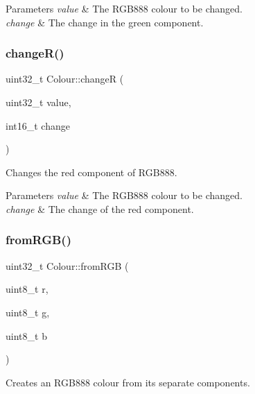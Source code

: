 \begin{DoxyParams}{Parameters}
{\em value} & The R\+G\+B888 colour to be changed. \\
\hline
{\em change} & The change in the green component. \\
\hline
\end{DoxyParams}
\mbox{\label{namespaceColour_ad2740cc3e6b9f1d65d6cfe085ec2f1bf}} 
\subsubsection{\texorpdfstring{change\+R()}{changeR()}}
{\footnotesize\ttfamily uint32\+\_\+t Colour\+::changeR (\begin{DoxyParamCaption}\item[{uint32\+\_\+t}]{value,  }\item[{int16\+\_\+t}]{change }\end{DoxyParamCaption})}



Changes the red component of R\+G\+B888. 


\begin{DoxyParams}{Parameters}
{\em value} & The R\+G\+B888 colour to be changed. \\
\hline
{\em change} & The change of the red component. \\
\hline
\end{DoxyParams}
\mbox{\label{namespaceColour_a2ee4192ca3c1535351e57f223e5fb65d}} 
\subsubsection{\texorpdfstring{from\+R\+G\+B()}{fromRGB()}}
{\footnotesize\ttfamily uint32\+\_\+t Colour\+::from\+R\+GB (\begin{DoxyParamCaption}\item[{uint8\+\_\+t}]{r,  }\item[{uint8\+\_\+t}]{g,  }\item[{uint8\+\_\+t}]{b }\end{DoxyParamCaption})}



Creates an R\+G\+B888 colour from its separate components. 


